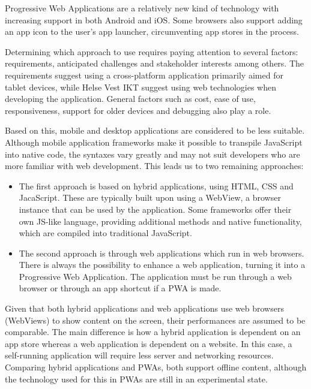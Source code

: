 Progressive Web Applications are a relatively new kind of technology with increasing support in both Android and iOS. Some browsers also support adding an app icon to the user's app launcher, circumventing app stores in the process.


Determining which approach to use requires paying attention to several factors: requirements, anticipated challenges and stakeholder interests among others. The requirements suggest using a cross-platform application primarily aimed for tablet devices, while Helse Vest IKT suggest using web technologies when developing the application. General factors such as cost, ease of use, responsiveness, support for older devices and debugging also play a role. 

Based on this, mobile and desktop applications are considered to be less suitable. Although mobile application frameworks make it possible to transpile JavaScript into native code, the syntaxes vary greatly and may not suit developers who are more familiar with web development. This leads us to two remaining approaches:

\begin{itemize}
    \item The first approach is based on hybrid applications, using HTML, CSS and JacaScript. These are typically built upon using a WebView, a browser instance that can be used by the application. Some frameworks offer their own JS-like language, providing additional methods and native functionality, which are compiled into traditional JavaScript.
    \item The second approach is through web applications which run in web browsers. There is always the possibility to enhance a web application, turning it into a Progressive Web Application. The application must be run through a web browser or through an app shortcut if a PWA is made.
\end{itemize}


Given that both hybrid applications and web applications use web browsers (WebViews) to show content on the screen, their performances are assumed to be comparable. The main difference is how a hybrid application is dependent on an app store whereas a web application is dependent on a website. In this case, a self-running application will require less server and networking resources. Comparing hybrid applications and PWAs, both support offline content, although the technology used for this in PWAs are still in an experimental state.

